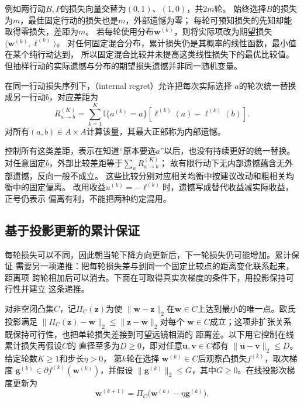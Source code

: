 例如两行动\(B,P\)的损失向量交替为\((0,1)\)、\((1,0)\)，共\(2m\)轮。
始终选择\(B\)的损失为\(m\)，最佳固定行动的损失也是\(m\)，外部遗憾为零；
每轮可预知损失的先知却能取得零损失，差距为\(m\)。
若每轮使用分布\(\bm w^{(k)}\)，则将实际项改为期望损失
\(\langle\bm w^{(k)},\bm\ell^{(k)}\rangle\)。
对任何固定混合分布，累计损失仍是其概率的线性函数，最小值在某个纯行动达到，
所以固定混合比较并未提高这类线性损失下的最优比较值。
但抽样行动的实际遗憾与分布的期望损失遗憾并非同一随机变量。

\begin{definition}[内部遗憾]
\label{def:game-internal-regret}
在同一行动损失序列下，（internal regret）允许把每次实际选择
\(a\)的轮次统一替换成另一行动\(b\)，对应差距为
\[
  R_{a\to b}^{(K)}
  =\sum_{k=1}^K\mathbb I\{a^{(k)}=a\}
    [\ell^{(k)}(a)-\ell^{(k)}(b)].
\]
对所有\((a,b)\in A\times A\)计算该量，其最大正部称为内部遗憾。
\end{definition}
控制所有这类差距，表示在知道“原本要选\(a\)”以后，也没有持续更好的统一替换。
对任意固定\(b\)，外部比较差距等于\(\sum_aR_{a\to b}^{(K)}\)；
故有限行动下无内部遗憾蕴含无外部遗憾，反向一般不成立。
这些比较分别对应相关均衡中按建议改动和粗相关均衡中的固定偏离。
改用收益\(u^{(k)}=-\ell^{(k)}\)时，遗憾写成替代收益减实际收益，正号仍表示
偏离有利，不能把两种约定混用。

\subsection{基于投影更新的累计保证}
\label{sec:game-projection-regret}

每轮损失可以不同，因此朝当轮下降方向更新后，下一轮损失仍可能增加。累计保证
需要另一项递推：把每轮损失差与到同一个固定比较点的距离变化联系起来，距离项
跨轮相加后可以消去。下面在可取得真实次梯度的条件下，用投影保持可行性并建立
这条递推。

对非空闭凸集\(C\)，记\(\Pi_C(\bm z)\)为使
\(\lVert\bm w-\bm z\rVert_2\)在\(\bm w\in C\)上达到最小的唯一点。欧氏投影满足
\(\lVert\Pi_C(\bm z)-\bm w\rVert_2\leq\lVert\bm z-\bm w\rVert_2\)对每个
\(\bm w\in C\)成立；这项非扩张关系既保持可行性，也把单轮损失差接到可望远镜相消的
距离差。以下用它控制在线累计损失再假设\(C\)的
直径至多为\(D\geq0\)，即对任意\(\bm{u},\bm{v}\in C\)都有
\(\lVert\bm{u}-\bm{v}\rVert_2\leq D\)。给定轮数\(K\geq1\)和步长\(\eta>0\)，
第\(k\)轮在选择
\(\bm{w}^{(k)}\in C\)后观察凸损失\(f^{(k)}\)，取次梯度
\(\bm{g}^{(k)}\in\partial f^{(k)}(\bm{w}^{(k)})\)，并假设
\(\lVert\bm{g}^{(k)}\rVert_2\leq G\)，其中\(G\geq0\)。在线投影次梯度更新为
\begin{equation}
  \bm{w}^{(k+1)}
  =
  \Pi_C\bigl(
    \bm{w}^{(k)}-\eta\bm{g}^{(k)}
  \bigr).
  \label{eq:game-online-projected-gradient}
\end{equation}

